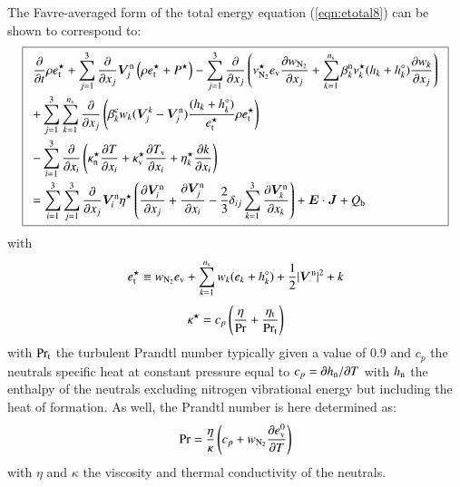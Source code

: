 \documentclass{warpdoc}
\newcommand\frameeqn[1]{\fbox{$\displaystyle #1$}}
\newcommand{\alb}{\vspace{0.1cm}\\} %
\newcommand{\mfd}{\displaystyle}
\newcommand{\ns}{{n_{\rm s}}}
\newcommand{\ev}{{e_{\rm v}}}
\newcommand{\evzero}{{e_{\rm v}^0}}
\newcommand{\visc}{\eta}
\renewcommand{\vec}[1]{\bm{#1}}
\begin{document}
The Favre-averaged form of the total energy equation (\ref{eqn:etotal8}) can be shown to correspond to:
%
\begin{equation}
\frameeqn{
\begin{array}{l}\mfd
 \frac{\partial }{\partial t}\rho e_{\rm t}^\star
+ \sum_{j=1}^3  \frac{\partial }{\partial x_j} \vec{V}_j^{\rm n} \left(\rho  e_{\rm t}^\star +  P^\star \right)
- \sum_{j=1}^3  \frac{\partial }{\partial x_j} \left(
   \nu_{\rm N_2}^\star \ev\frac{\partial w_{\rm N_2}}{\partial x_j} + \sum_{k=1}^\ns \beta_k^{\rm n} \nu_k^\star (h_k+h_k^\circ)\frac{\partial w_k}{\partial x_j} 
\right)
 \alb\mfd
+ \sum_{j=1}^3 \sum_{k=1}^\ns  \frac{\partial }{\partial x_j} \left(
  \beta_k^{\rm c} w_k (\vec{V}^k_j-\vec{V}^{\rm n}_j) \frac{(h_k+h_k^\circ)}{e_{\rm t}^\star} \rho e_{\rm t}^\star 
\right)\alb\mfd
-\sum_{i=1}^{3}\frac{\partial }{\partial x_i}\left(\kappa_{\rm n}^\star \frac{\partial T}{\partial x_i} + \kappa_{\rm v}^\star \frac{\partial T_{\rm v}}{\partial x_i}
+ \visc_{k}^\star \frac{\partial k}{\partial x_i}\right)
\alb\mfd
=
 \sum_{i=1}^3 \sum_{j=1}^3  \frac{\partial }{\partial x_j}  \vec{V}_i^{\rm n} \visc^\star  \left( \frac{\partial \vec{V}^{\rm n}_i}{\partial x_j} + \frac{\partial \vec{V}^{\rm n}_j}{\partial x_i} - \frac{2}{3} \delta_{ij} \sum_{k=1}^3 \frac{\partial \vec{V}^{\rm n}_k}{\partial x_k} \right)
+ \vec{E}\cdot\vec{J}
+ Q_{\rm b}
\end{array}
}
\label{eqn:etotal_turb}
\end{equation}
%  
with
%
\begin{equation}
e_{\rm t}^\star \equiv w_{\rm N_2} \ev + \sum_{k=1}^\ns w_k (e_k + h_k^\circ) +\frac{1}{2} |\vec{V}^{\rm n}|^2 + k
\end{equation}
%
%
\begin{equation}
\kappa^\star=c_p\left( \frac{\visc}{\rm Pr} +\frac{\visc_{\rm t}}{{\rm Pr_t}}\right)
\end{equation}
%
with $\rm Pr_t$ the turbulent Prandtl number typically given a value of 0.9 and $c_p$ the neutrals specific heat at constant pressure equal to $c_p=\partial h_{\rm n} / \partial T$ with $h_{\rm n}$ the enthalpy of the neutrals excluding nitrogen vibrational energy but including the heat of formation.  As well, the Prandtl number is here determined as:
%
\begin{equation}
{\rm Pr}=\frac{\visc}{\kappa}\left( c_p + w_{\rm N_2} \frac{\partial \evzero}{\partial T}\right)
\end{equation}
% 
with $\visc$ and $\kappa$ the viscosity and thermal conductivity of the neutrals.	
\end{document}
